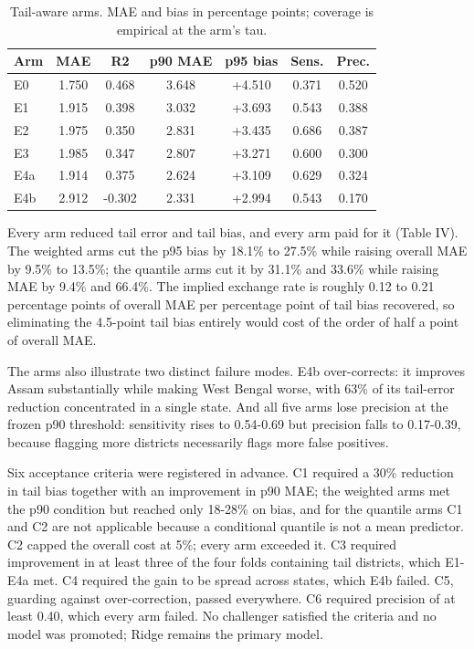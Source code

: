\documentclass[conference]{IEEEtran}
\begin{document}
\begin{table}[t]
\centering
\caption{Tail-aware arms. MAE and bias in percentage points; coverage is empirical at the arm's tau.}
\label{tab:3503}
\small
\setlength{\tabcolsep}{4pt}
\begin{tabular}{lcccccc}
\toprule
\textbf{Arm} & \textbf{MAE} & \textbf{R2} & \textbf{p90 MAE} & \textbf{p95 bias} & \textbf{Sens.} & \textbf{Prec.} \\
\midrule
E0 & 1.750 & 0.468 & 3.648 & +4.510 & 0.371 & 0.520 \\
E1 & 1.915 & 0.398 & 3.032 & +3.693 & 0.543 & 0.388 \\
E2 & 1.975 & 0.350 & 2.831 & +3.435 & 0.686 & 0.387 \\
E3 & 1.985 & 0.347 & 2.807 & +3.271 & 0.600 & 0.300 \\
E4a & 1.914 & 0.375 & 2.624 & +3.109 & 0.629 & 0.324 \\
E4b & 2.912 & -0.302 & 2.331 & +2.994 & 0.543 & 0.170 \\
\bottomrule
\end{tabular}
\end{table}

Every arm reduced tail error and tail bias, and every arm paid for it (Table IV). The weighted arms cut the p95 bias by 18.1\% to 27.5\% while raising overall MAE by 9.5\% to 13.5\%; the quantile arms cut it by 31.1\% and 33.6\% while raising MAE by 9.4\% and 66.4\%. The implied exchange rate is roughly 0.12 to 0.21 percentage points of overall MAE per percentage point of tail bias recovered, so eliminating the 4.5-point tail bias entirely would cost of the order of half a point of overall MAE.

The arms also illustrate two distinct failure modes. E4b over-corrects: it improves Assam substantially while making West Bengal worse, with 63\% of its tail-error reduction concentrated in a single state. And all five arms lose precision at the frozen p90 threshold: sensitivity rises to 0.54-0.69 but precision falls to 0.17-0.39, because flagging more districts necessarily flags more false positives.

Six acceptance criteria were registered in advance. C1 required a 30\% reduction in tail bias together with an improvement in p90 MAE; the weighted arms met the p90 condition but reached only 18-28\% on bias, and for the quantile arms C1 and C2 are not applicable because a conditional quantile is not a mean predictor. C2 capped the overall cost at 5\%; every arm exceeded it. C3 required improvement in at least three of the four folds containing tail districts, which E1-E4a met. C4 required the gain to be spread across states, which E4b failed. C5, guarding against over-correction, passed everywhere. C6 required precision of at least 0.40, which every arm failed. No challenger satisfied the criteria and no model was promoted; Ridge remains the primary model.
\end{document}
